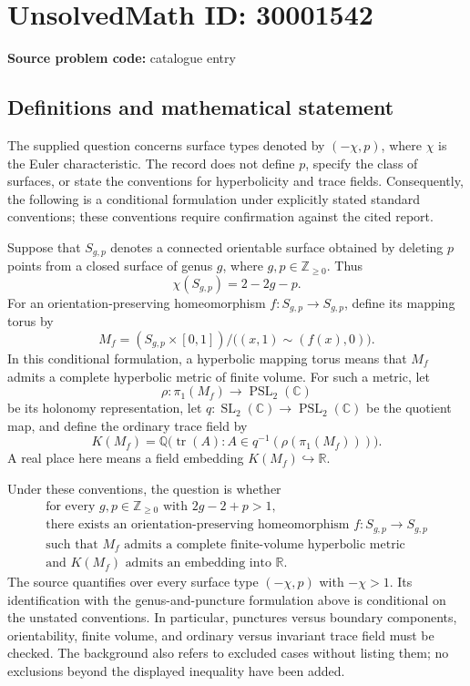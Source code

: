 \documentclass[11pt]{article}
\newcommand{\Z}{\mathbb{Z}}
\newcommand{\Q}{\mathbb{Q}}
\newcommand{\R}{\mathbb{R}}
\newcommand{\C}{\mathbb{C}}
\begin{document}
\section*{UnsolvedMath ID: 30001542}
\textbf{Source problem code:} catalogue entry
\subsection{Definitions and mathematical statement}
The supplied question concerns surface types denoted by \(( -\chi,p)\), where \(\chi\) is the Euler characteristic. The record does not define \(p\), specify the class of surfaces, or state the conventions for hyperbolicity and trace fields. Consequently, the following is a conditional formulation under explicitly stated standard conventions; these conventions require confirmation against the cited report.

Suppose that \(S_{g,p}\) denotes a connected orientable surface obtained by deleting \(p\) points from a closed surface of genus \(g\), where \(g,p\in\Z_{\geq 0}\). Thus
\[
\chi(S_{g,p})=2-2g-p.
\]
For an orientation-preserving homeomorphism \(f:S_{g,p}\to S_{g,p}\), define its mapping torus by
\[
M_f=(S_{g,p}\times[0,1])/\bigl((x,1)\sim(f(x),0)\bigr).
\]
In this conditional formulation, a hyperbolic mapping torus means that \(M_f\) admits a complete hyperbolic metric of finite volume. For such a metric, let
\[
\rho:\pi_1(M_f)\longrightarrow\operatorname{PSL}_2(\C)
\]
be its holonomy representation, let \(q:\operatorname{SL}_2(\C)\to\operatorname{PSL}_2(\C)\) be the quotient map, and define the ordinary trace field by
\[
K(M_f)=\Q\bigl(\operatorname{tr}(A):A\in q^{-1}(\rho(\pi_1(M_f)))\bigr).
\]
A real place here means a field embedding \(K(M_f)\hookrightarrow\R\).

Under these conventions, the question is whether
\[
\begin{gathered}
\text{for every }g,p\in\Z_{\geq0}\text{ with }2g-2+p>1,\\
\text{there exists an orientation-preserving homeomorphism }f:S_{g,p}\to S_{g,p}\\
\text{such that }M_f\text{ admits a complete finite-volume hyperbolic metric}\\
\text{and }K(M_f)\text{ admits an embedding into }\R.
\end{gathered}
\]
The source quantifies over every surface type \(( -\chi,p)\) with \(-\chi>1\). Its identification with the genus-and-puncture formulation above is conditional on the unstated conventions. In particular, punctures versus boundary components, orientability, finite volume, and ordinary versus invariant trace field must be checked. The background also refers to excluded cases without listing them; no exclusions beyond the displayed inequality have been added.
\end{document}
